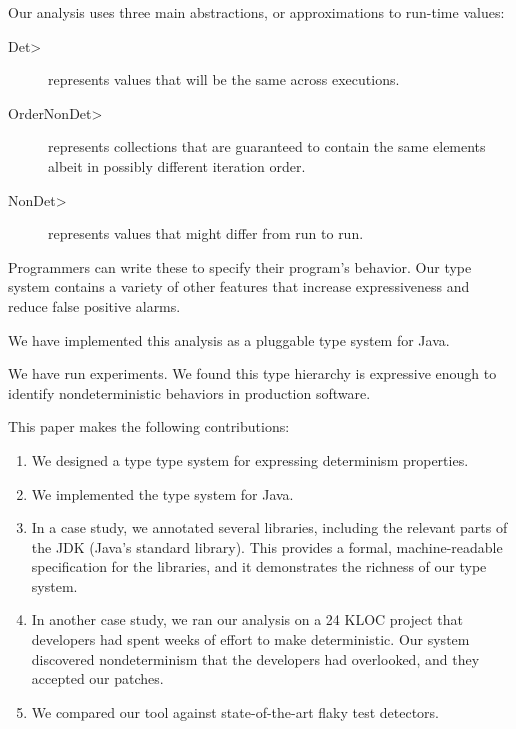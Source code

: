 Our analysis uses three main abstractions, or approximations to run-time values:
\begin{description}
\item[\<Det>] represents values that will be the same across executions.
\item[\<OrderNonDet>] represents collections that are guaranteed to contain the same elements albeit in possibly
different iteration order.
\item[\<NonDet>] represents values that
might differ from run to run.
\end{description}
\noindent
Programmers can write these to specify their program's behavior.
Our type system contains a variety of other features that increase
expressiveness and reduce false positive alarms.

We have implemented this analysis as a pluggable type system for Java.

We have run experiments.
We found this type hierarchy
is expressive enough to identify nondeterministic behaviors in production software.

This paper makes the following contributions:
\begin{enumerate}
  \item We designed a type type system for expressing determinism properties.

  \item We implemented the type system for Java.

  \item In a case study, we annotated several libraries, including the
    relevant parts of the JDK (Java's standard library).  This provides a
    formal, machine-readable specification for the libraries, and it
    demonstrates the richness of our type system.

  \item In another case study, we ran our analysis on a 24 KLOC project that
    developers had spent weeks of effort to make deterministic.  Our system
    discovered nondeterminism that the developers had overlooked, and they
    accepted our patches.

  \item We compared our tool against state-of-the-art flaky test
    detectors.
\end{enumerate}


